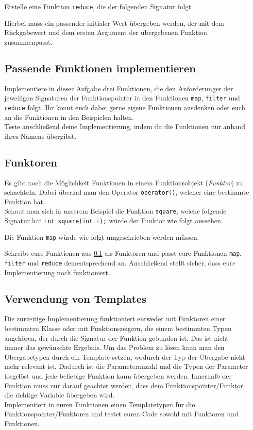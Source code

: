 Erstelle eine Funktion \lstinline{reduce}, die der folgenden Signatur folgt.



Hierbei muss ein passender initialer Wert übergeben werden, der mit dem Rückgabewert und dem ersten Argument der übergebenen Funktion zusammenpasst.

\subsection{Passende Funktionen implementieren}
\label{sec:functional_impl_func}
Implementiere in dieser Aufgabe drei Funktionen, die den Anforderunger der jeweiligen Signaturen der Funktionspointer in den Funktionen \lstinline{map}, \lstinline{filter} und \lstinline{reduce} folgt.
Ihr könnt euch dabei gerne eigene Funktionen ausdenken oder euch an die Funktionen in den Beispielen halten. \\

Teste anschließend deine Implementierung, indem du die Funktionen nur anhand ihres Namens übergibst.

\subsection{Funktoren}
Es gibt noch die Möglichkeit Funktionen in einem Funktionsobjekt (\emph{Funktor}) zu schachteln.
Dabei überlad man den Operator \lstinline{operator()}, welcher eine bestimmte Funktion hat. \\

Schaut man sich in unserem Beispiel die Funktion \lstinline{square}, welche folgende Signatur hat \lstinline{int square(int i);} würde der Funktor wie folgt aussehen.



Die Funktion \lstinline{map} würde wie folgt umgeschrieben werden müssen.



Schreibt eure Funktionen aus \ref{sec:functional_impl_func} als Funktoren und passt eure Funktionen \lstinline{map}, \lstinline{filter} und \lstinline{reduce} dementsprechend an.
Anschließend stellt sicher, dass eure Implementierung noch funktioniert.

\subsection{Verwendung von Templates}
Die zurzeitige Implementierung funktioniert entweder mit Funktoren einer bestimmten Klasse oder mit Funktionszeigern, die einem bestimmten Typen angehören, der durch die Signatur der Funktion gebunden ist.
Das ist nicht immer das gewünschte Ergebnis.
Um das Problem zu lösen kann man den Übergabetypen durch ein Template setzen, wodurch der Typ der Übergabe nicht mehr relevant ist.
Dadurch ist die Parameteranzahl und die Typen der Parameter losgelöst und jede beliebige Funktion kann übergeben werden.
Innerhalb der Funktion muss nur darauf geachtet werden, dass dem Funktionspointer/Funktor die richtige Variable übergeben wird. \\

Implementiert in euren Funktionen einen Templatetypen für die Funktionspointer/Funktoren und testet euren Code sowohl mit Funktoren und Funktionen.
